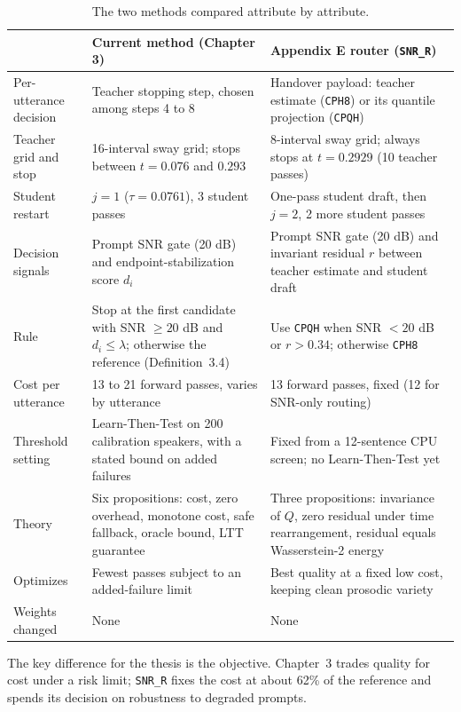 \documentclass[11pt,a4paper]{article}
\newcommand{\snrr}{\texttt{SNR\_R}}
\begin{document}
\begin{table}[!htbp]
\centering\small
\caption{The two methods compared attribute by attribute.}
\label{tab:side}
\begin{tabularx}{\textwidth}{@{}P{3.1cm} L L@{}}
\toprule
& \textbf{Current method (Chapter 3)} & \textbf{Appendix E router (\snrr)} \\
\midrule
Per-utterance decision & Teacher stopping step, chosen among steps 4 to 8 & Handover payload: teacher estimate (\texttt{CPH8}) or its quantile projection (\texttt{CPQH}) \\
Teacher grid and stop & 16-interval sway grid; stops between $t=0.076$ and $0.293$ & 8-interval sway grid; always stops at $t=0.2929$ (10 teacher passes) \\
Student restart & $j=1$ ($\tau=0.0761$), 3 student passes & One-pass student draft, then $j=2$, 2 more student passes \\
Decision signals & Prompt SNR gate (20 dB) and endpoint-stabilization score $d_i$ & Prompt SNR gate (20 dB) and invariant residual $r$ between teacher estimate and student draft \\
Rule & Stop at the first candidate with SNR $\ge 20$ dB and $d_i\le\lambda$; otherwise the reference (Definition~3.4) & Use \texttt{CPQH} when SNR $<20$ dB or $r>0.34$; otherwise \texttt{CPH8} \\
Cost per utterance & 13 to 21 forward passes, varies by utterance & 13 forward passes, fixed (12 for SNR-only routing) \\
Threshold setting & Learn-Then-Test on 200 calibration speakers, with a stated bound on added failures & Fixed from a 12-sentence CPU screen; no Learn-Then-Test yet \\
Theory & Six propositions: cost, zero overhead, monotone cost, safe fallback, oracle bound, LTT guarantee & Three propositions: invariance of $Q$, zero residual under time rearrangement, residual equals Wasserstein-2 energy \\
Optimizes & Fewest passes subject to an added-failure limit & Best quality at a fixed low cost, keeping clean prosodic variety \\
Weights changed & None & None \\
\bottomrule
\end{tabularx}
\end{table}

The key difference for the thesis is the objective. Chapter~3 trades quality for cost under a risk limit; \snrr{} fixes the cost at about 62\% of the reference and spends its decision on robustness to degraded prompts.
\end{document}

